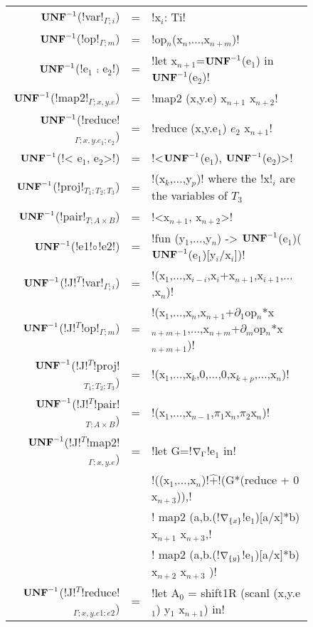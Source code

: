 \begin{figure*}[t]
    \begin{tabular}{r c l}
    $\mathbf{UNF}^{-1}$(!var!$_{\Gamma;i}$) &=& !x$_i$: Ti! \\
    $\mathbf{UNF}^{-1}$(!op!$_{\Gamma;m}$) &=& !op$_n$(x$_n$,$\ldots$,x$_{n+m}$)! \\
    $\mathbf{UNF}^{-1}$(!e$_1$ $\comp$ e$_2$!) &=& !let x$_{n+1}$=$\mathbf{UNF}^{-1}$(e$_1$) in $\mathbf{UNF}^{-1}$(e$_2$)! \\
    $\mathbf{UNF}^{-1}$(!map2!$_{\Gamma;x,y.e}$) &=& !map2 (x,y.e) x$_{n+1}$ x$_{n+2}$! \\
    $\mathbf{UNF}^{-1}$(!reduce!$_{\Gamma;x,y.e_1;e_2}$) &=& !reduce (x,y.e$_1$) $e_2$ x$_{n+1}$! \\
    $\mathbf{UNF}^{-1}$(!< e$_1$, e$_2$>!) &=& !<$\mathbf{UNF}^{-1}$(e$_1$), $\mathbf{UNF}^{-1}$(e$_2$)>! \\
    $\mathbf{UNF}^{-1}$(!proj!$_{T_1;T_2;T_3}$) &=& !(x$_{k}$,$\ldots$,y$_{p}$)! where the !x!$_{i}$ are the variables of $T_3$ \\
    $\mathbf{UNF}^{-1}$(!pair!$_{T;A\times B}$) &=& !<x$_{n+1}$, x$_{n+2}$>! \\
    $\mathbf{UNF}^{-1}$(!e1!$\circ$!e2!) &=& !fun (y$_1$,$\ldots$,y$_n$) -> $\mathbf{UNF}^{-1}$(e$_1$)($\mathbf{UNF}^{-1}$(e$_1$)[y$_i$/x$_i$])! \\
    $\mathbf{UNF}^{-1}$(!J!$^T$!var!$_{\Gamma;i}$) &=& !(x$_1$,$\ldots$,x$_{i-i}$,x$_i$+x$_{n+1}$,x$_{i+1}$,$\ldots$,x$_{n}$)! \\
    $\mathbf{UNF}^{-1}$(!J!$^T$!op!$_{\Gamma;m}$) &=& !(x$_1$,$\ldots$,x$_{n}$,x$_{n+1}$+$\partial_1$op$_n$*x$_{n+m+1}$,$\ldots$,x$_{n+m}$+$\partial_m$op$_n$*x$_{n+m+1}$)! \\
    $\mathbf{UNF}^{-1}$(!J!$^T$!proj!$_{T_1;T_2;T_3}$) &=& !(x$_1$,$\ldots$,x$_k$,0,$\ldots$,0,x$_{k+p}$,$\ldots$,x$_n$)! \\
    $\mathbf{UNF}^{-1}$(!J!$^T$!pair!$_{T;A\times B}$) &=& !(x$_1$,$\ldots$,x$_{n-1}$,$\pi_1$x$_n$,$\pi_2$x$_n$)! \\
    $\mathbf{UNF}^{-1}$(!J!$^T$!map2!$_{\Gamma;x,y.e}$) &=& 
    !let G=!$\nabla_{\Gamma}$!e$_{1}$ in!\\
    && !((x$_{1}$,$\ldots$,x$_n$)!$\widehat{+}$!(G*(reduce + 0 x$_{n+3}$)),!\\
    && ! map2 (a,b.(!$\nabla_{\{x\}}$!e$_{1}$)[a/x]*b) x$_{n+1}$ x$_{n+3}$,!\\
    && ! map2 (a,b.(!$\nabla_{\{y\}}$!e$_{1}$)[a/x]*b) x$_{n+2}$ x$_{n+3}$ )!\\
    $\mathbf{UNF}^{-1}$(!J!$^T$!reduce!$_{\Gamma;x,y.e1;e2}$) &=& !let A$_{0}$ = shift1R (scanl (x,y.e$_{1}$) y$_{1}$ x$_{n+1}$) in! \\

\end{tabular}
\end{figure*}
